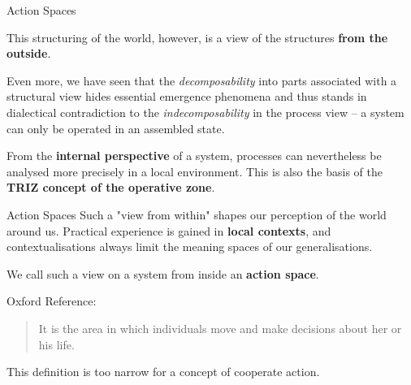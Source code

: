 \documentclass{beamer}
\begin{document}
\begin{frame}{Action Spaces}

This structuring of the world, however, is a view of the structures
\textbf{from the outside}.

Even more, we have seen that the \emph{decomposability} into parts associated
with a structural view hides essential emergence phenomena and thus stands in
dialectical contradiction to the \emph{indecomposability} in the process view
-- a system can only be operated in an assembled state.

From the \textbf{internal perspective} of a system, processes can nevertheless
be analysed more precisely in a local environment. This is also the basis of
the \textbf{TRIZ concept of the operative zone}.

\end{frame}

\begin{frame}{Action Spaces}
Such a "view from within" shapes our perception of the world around us.
Practical experience is gained in \textbf{local contexts}, and
contextualisations always limit the meaning spaces of our generalisations.

\begin{block}{}
  We call such a view on a system from inside an \textbf{action space}.
\end{block}

Oxford Reference:
\begin{quote}
  It is the area in which individuals move and make decisions about her or
  his life.
\end{quote}

This definition is too narrow for a concept of cooperate action. 

\end{frame}
\end{document}
